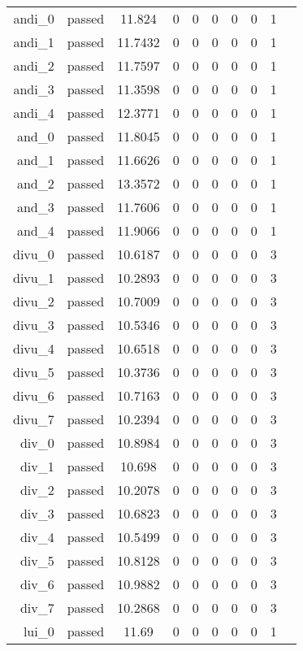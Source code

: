 \begin{longtable}{r|ccccccccc}
    andi\_0 & passed & 11.824 & 0 & 0 & 0 & 0 & 0 & 1 \\
    andi\_1 & passed & 11.7432 & 0 & 0 & 0 & 0 & 0 & 1 \\
    andi\_2 & passed & 11.7597 & 0 & 0 & 0 & 0 & 0 & 1 \\
    andi\_3 & passed & 11.3598 & 0 & 0 & 0 & 0 & 0 & 1 \\
    andi\_4 & passed & 12.3771 & 0 & 0 & 0 & 0 & 0 & 1 \\
    and\_0 & passed & 11.8045 & 0 & 0 & 0 & 0 & 0 & 1 \\
    and\_1 & passed & 11.6626 & 0 & 0 & 0 & 0 & 0 & 1 \\
    and\_2 & passed & 13.3572 & 0 & 0 & 0 & 0 & 0 & 1 \\
    and\_3 & passed & 11.7606 & 0 & 0 & 0 & 0 & 0 & 1 \\
    and\_4 & passed & 11.9066 & 0 & 0 & 0 & 0 & 0 & 1 \\
    divu\_0 & passed & 10.6187 & 0 & 0 & 0 & 0 & 0 & 3 \\
    divu\_1 & passed & 10.2893 & 0 & 0 & 0 & 0 & 0 & 3 \\
    divu\_2 & passed & 10.7009 & 0 & 0 & 0 & 0 & 0 & 3 \\
    divu\_3 & passed & 10.5346 & 0 & 0 & 0 & 0 & 0 & 3 \\
    divu\_4 & passed & 10.6518 & 0 & 0 & 0 & 0 & 0 & 3 \\
    divu\_5 & passed & 10.3736 & 0 & 0 & 0 & 0 & 0 & 3 \\
    divu\_6 & passed & 10.7163 & 0 & 0 & 0 & 0 & 0 & 3 \\
    divu\_7 & passed & 10.2394 & 0 & 0 & 0 & 0 & 0 & 3 \\
    div\_0 & passed & 10.8984 & 0 & 0 & 0 & 0 & 0 & 3 \\
    div\_1 & passed & 10.698 & 0 & 0 & 0 & 0 & 0 & 3 \\
    div\_2 & passed & 10.2078 & 0 & 0 & 0 & 0 & 0 & 3 \\
    div\_3 & passed & 10.6823 & 0 & 0 & 0 & 0 & 0 & 3 \\
    div\_4 & passed & 10.5499 & 0 & 0 & 0 & 0 & 0 & 3 \\
    div\_5 & passed & 10.8128 & 0 & 0 & 0 & 0 & 0 & 3 \\
    div\_6 & passed & 10.9882 & 0 & 0 & 0 & 0 & 0 & 3 \\
    div\_7 & passed & 10.2868 & 0 & 0 & 0 & 0 & 0 & 3 \\
    lui\_0 & passed & 11.69 & 0 & 0 & 0 & 0 & 0 & 1 \\

\end{longtable}
